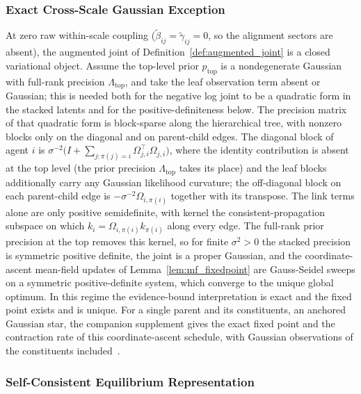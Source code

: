 \subsubsection{Exact Cross-Scale Gaussian Exception}
\label{app:cross_scale_gaussian_exception}

At zero raw within-scale coupling ($\tilde\beta_{ij}=\tilde\gamma_{ij}=0$, so the alignment sectors are absent), the augmented joint of Definition~\ref{def:augmented_joint} is a closed variational object. Assume the top-level prior $p_{\mathrm{top}}$ is a nondegenerate Gaussian with full-rank precision $\Lambda_{\mathrm{top}}$, and take the leaf observation term absent or Gaussian; this is needed both for the negative log joint to be a quadratic form in the stacked latents and for the positive-definiteness below. The precision matrix of that quadratic form is block-sparse along the hierarchical tree, with nonzero blocks only on the diagonal and on parent-child edges. The diagonal block of agent $i$ is $\sigma^{-2}\big(I + \sum_{j : \pi(j) = i}\Omega_{j,i}^\top\Omega_{j,i}\big)$, where the identity contribution is absent at the top level (the prior precision $\Lambda_{\mathrm{top}}$ takes its place) and the leaf blocks additionally carry any Gaussian likelihood curvature; the off-diagonal block on each parent-child edge is $-\sigma^{-2}\Omega_{i,\pi(i)}$ together with its transpose. The link terms alone are only positive semidefinite, with kernel the consistent-propagation subspace on which $k_i = \Omega_{i,\pi(i)}k_{\pi(i)}$ along every edge. The full-rank prior precision at the top removes this kernel, so for finite $\sigma^2 > 0$ the stacked precision is symmetric positive definite, the joint is a proper Gaussian, and the coordinate-ascent mean-field updates of Lemma~\ref{lem:mf_fixedpoint} are Gauss-Seidel sweeps on a symmetric positive-definite system, which converge to the unique global optimum. In this regime the evidence-bound interpretation is exact and the fixed point exists and is unique. For a single parent and its constituents, an anchored Gaussian star, the companion supplement gives the exact fixed point and the contraction rate of this coordinate-ascent schedule, with Gaussian observations of the constituents included~\cite[Ch.~G10]{DennisGaugeVFESuppG2026}.

\subsubsection{Self-Consistent Equilibrium Representation}

